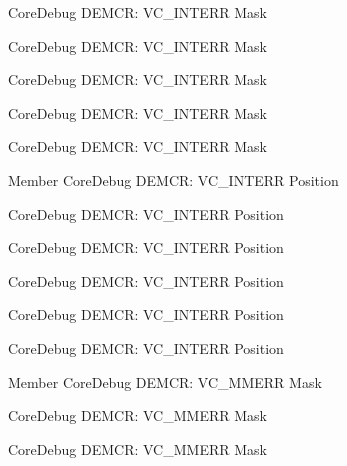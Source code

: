 \begin{DoxyRefList}
\label{deprecated__deprecated000344}%
%
Core\+Debug DEMCR\+: VC\+\_\+\+INTERR Mask 

\label{deprecated__deprecated000420}%
%
Core\+Debug DEMCR\+: VC\+\_\+\+INTERR Mask 

\label{deprecated__deprecated000058}%
%
Core\+Debug DEMCR\+: VC\+\_\+\+INTERR Mask 

\label{deprecated__deprecated000611}%
%
Core\+Debug DEMCR\+: VC\+\_\+\+INTERR Mask 

\label{deprecated__deprecated000202}%
%
Core\+Debug DEMCR\+: VC\+\_\+\+INTERR Mask  
\item[Member \doxylink{group__CMSIS__CoreDebug_ga22079a6e436f23b90308be97e19cf07e}{Core\+Debug\+\_\+\+DEMCR\+\_\+\+VC\+\_\+\+INTERR\+\_\+\+Pos} ]\label{deprecated__deprecated000610}%
%
Core\+Debug DEMCR\+: VC\+\_\+\+INTERR Position 

\label{deprecated__deprecated000419}%
%
Core\+Debug DEMCR\+: VC\+\_\+\+INTERR Position 

\label{deprecated__deprecated000057}%
%
Core\+Debug DEMCR\+: VC\+\_\+\+INTERR Position 

\label{deprecated__deprecated000201}%
%
Core\+Debug DEMCR\+: VC\+\_\+\+INTERR Position 

\label{deprecated__deprecated000343}%
%
Core\+Debug DEMCR\+: VC\+\_\+\+INTERR Position 

\label{deprecated__deprecated000508}%
%
Core\+Debug DEMCR\+: VC\+\_\+\+INTERR Position  
\item[Member \doxylink{group__CMSIS__CoreDebug_gad420a9b60620584faaca6289e83d3a87}{Core\+Debug\+\_\+\+DEMCR\+\_\+\+VC\+\_\+\+MMERR\+\_\+\+Msk} ]\label{deprecated__deprecated000430}%
%
Core\+Debug DEMCR\+: VC\+\_\+\+MMERR Mask 

\label{deprecated__deprecated000212}%
%
Core\+Debug DEMCR\+: VC\+\_\+\+MMERR Mask 

\label{deprecated__deprecated000354}%
%
Core\+Debug DEMCR\+: VC\+\_\+\+MMERR Mask 


\end{DoxyRefList}
